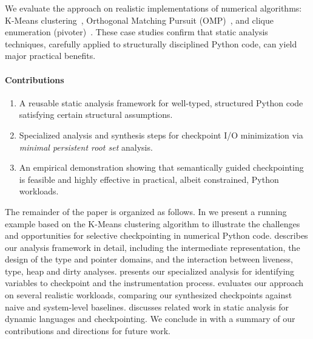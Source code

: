 We evaluate the approach on realistic implementations of numerical algorithms: K-Means clustering~\cite{macqueen1967multivariate}, Orthogonal Matching Pursuit (OMP)~\cite{Pati1993OMP}, and clique enumeration (pivoter)~\cite{jain2020power}. These case studies confirm that static analysis techniques, carefully applied to structurally disciplined Python code, can yield major practical benefits.


\paragraph{Contributions}
\begin{enumerate}
\item A reusable static analysis framework for well-typed, structured Python code satisfying certain structural assumptions.
\item Specialized analysis and synthesis steps for checkpoint I/O minimization via \emph{minimal persistent root set} analysis.
\item An empirical demonstration showing that semantically guided checkpointing is feasible and highly effective in practical, albeit constrained, Python workloads.
\end{enumerate}

The remainder of the paper is organized as follows. In  we present a running example based on the K-Means clustering algorithm to illustrate the challenges and opportunities for selective checkpointing in numerical Python code.  describes our analysis framework in detail, including the intermediate representation, the design of the type and pointer domains, and the interaction between liveness, type, heap and dirty analyses.  presents our specialized analysis for identifying variables to checkpoint and the instrumentation process.  evaluates our approach on several realistic workloads, comparing our synthesized checkpoints against naive and system-level baselines.  discusses related work in static analysis for dynamic languages and checkpointing. We conclude in  with a summary of our contributions and directions for future work.
